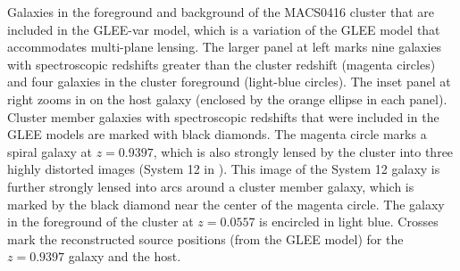 \label{fig:LineOfSightLenses}
Galaxies in the foreground and background of the MACS0416 cluster that
are included in the GLEE-var model, which is a variation of the GLEE
model that accommodates multi-plane lensing. The larger panel at left
marks nine galaxies with spectroscopic redshifts greater than the
cluster redshift (magenta circles) and four galaxies in the cluster
foreground (light-blue circles).  The inset panel at right zooms in on
the \spock host galaxy (enclosed by the orange ellipse in each panel).
Cluster member galaxies with spectroscopic redshifts that were
included in the GLEE models are marked with black diamonds.  The
magenta circle marks a spiral galaxy at $z=0.9397$, which is also
strongly lensed by the  cluster into three highly distorted
images (System 12 in ). This image of the System
12 galaxy is further strongly lensed into arcs around a cluster member
galaxy, which is marked by the black diamond near the center of the
magenta circle.  The galaxy in the foreground of the cluster at
$z=0.0557$ is encircled in light blue.  Crosses mark the reconstructed
source positions (from the GLEE model) for the $z=0.9397$ galaxy and
the \spock host.
